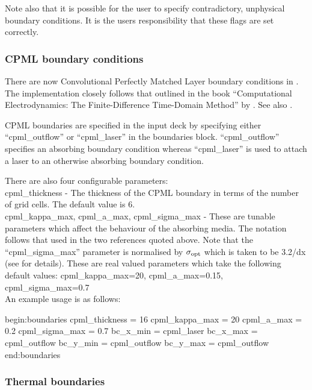 Note also that it is possible for the user to specify contradictory,
unphysical boundary conditions. It is the users responsibility that these
flags are set correctly.


\subsubsection{CPML boundary conditions}
\label{sec:cpml}
There are now Convolutional Perfectly Matched Layer boundary conditions
in {\EPOCH}. The implementation closely follows that outlined in the book
``Computational Electrodynamics: The Finite-Difference Time-Domain Method'' by
\citet{Taflove}.  See also \citet{Roden}.

CPML boundaries are specified in the input deck by specifying either
``cpml\_outflow'' or ``cpml\_laser'' in the boundaries block. ``cpml\_outflow''
specifies an absorbing boundary condition whereas ``cpml\_laser'' is used
to attach a laser to an otherwise absorbing boundary condition.

There are also four configurable parameters:\\

{\emphtext cpml\_thickness} - The thickness of the CPML boundary in terms of the
  number of grid cells. The default value is 6.\\

{\emphtext cpml\_kappa\_max}, {\emphtext cpml\_a\_max},
{\emphtext cpml\_sigma\_max} - These are tunable parameters which affect the
  behaviour of the absorbing media. The notation follows that used in the two
  references quoted above. Note that the ``cpml\_sigma\_max'' parameter is
  normalised by $\sigma_{\rm opt}$ which is taken to be 3.2/dx (see
  \citet{Taflove} for details). These are real valued
  parameters which take the following default values: cpml\_kappa\_max=20,
  cpml\_a\_max=0.15, cpml\_sigma\_max=0.7\\

An example usage is as follows:

{\samepage
\begin{boxverbatim}
begin:boundaries
   cpml_thickness = 16
   cpml_kappa_max = 20
   cpml_a_max = 0.2
   cpml_sigma_max = 0.7
   bc_x_min = cpml_laser
   bc_x_max = cpml_outflow
   bc_y_min = cpml_outflow
   bc_y_max = cpml_outflow
end:boundaries
\end{boxverbatim}
}

\subsubsection{Thermal boundaries}
\label{sec:thermal}

